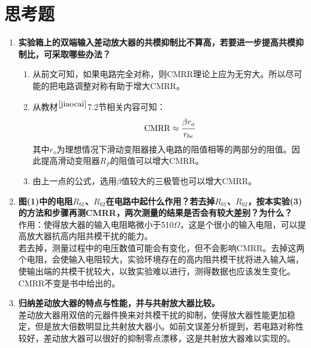 \documentclass[a4paper]{article}
\begin{document}
\section{思考题}
\begin{enumerate}
\item \textbf{实验箱上的双端输入差动放大器的共模抑制比不算高，若要进一步提高共模抑制比，可采取哪些办法？}\\
\begin{enumerate}
\item 从前文可知，如果电路完全对称，则CMRR理论上应为无穷大。所以尽可能的把电路调整对称有助于增大CMRR。
\item 从教材$^{\cite{jiaocai}}$7.2节相关内容可知：
$$\text{CMRR} \approx \cfrac{\beta r_o}{r_{be}}$$
其中$r_o$为理想情况下滑动变阻器接入电路的阻值相等的两部分的阻值。因此提高滑动变阻器$R_P$的阻值可以增大CMRR。
\item 由上一点的公式，选用$\beta$值较大的三极管也可以增大CMRR。
\end{enumerate}
\item \textbf{图(1)中的电阻$R_{b1}$、$R_{b2}$在电路中起什么作用？若去掉$R_{b1}$、$R_{b2}$，按本实验(3)的方法和步骤再测CMRR，两次测量的结果是否会有较大差别？为什么？}\\
作用：使得放大器的输入电阻略微小于510$\Omega$，这是个很小的输入电阻，可以提高放大器抗高内阻共模干扰的能力。\\
若去掉，测量过程中的电压数值可能会有变化，但不会影响CMRR。去掉这两个电阻，会使输入电阻较大，实验环境存在的高内阻共模干扰将进入输入端，使输出端的共模干扰较大，以致实验难以进行，测得数据也应该发生变化。CMRR不变是书中给出的。
\item \textbf{归纳差动放大器的特点与性能，并与共射放大器比较。}\\
差动放大器用双倍的元器件换来对共模干扰的抑制，使得放大器性能更加稳定，但是放大倍数明显比共射放大器小。如前文误差分析提到，若电路对称性较好，差动放大器可以很好的抑制零点漂移，这是共射放大器难以实现的。
\end{enumerate}

\end{document}
